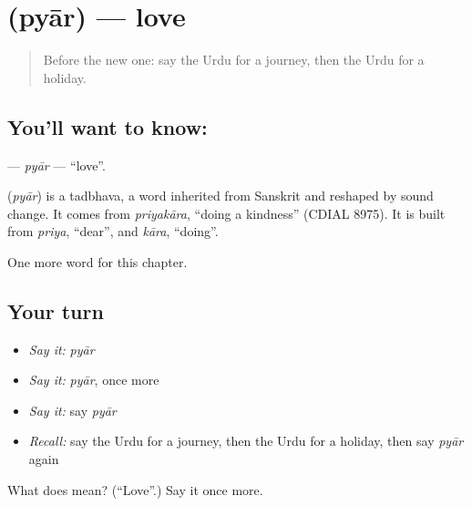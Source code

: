 \section[\texorpdfstring{\ur{پیار} (pyār)}{پیار (pyār)}]{ (pyār) — love}

\label{lesson:UR-C87-pyar}



\begin{quote}
Before the new one: say the Urdu for a journey, then the Urdu for a holiday.
\end{quote}

\subsection*{You'll want to know: }
\textbf{} — \emph{pyār} — \textquotedblleft{}love\textquotedblright{}.

\begin{cousinweb}
\textbf{} (\emph{pyār}) is a tadbhava, a word inherited from Sanskrit and reshaped by sound change. It comes from \emph{priyakāra}, \textquotedblleft{}doing a kindness\textquotedblright{} (CDIAL 8975). It is built from \emph{priya}, \textquotedblleft{}dear\textquotedblright{}, and \emph{kāra}, \textquotedblleft{}doing\textquotedblright{}.
\end{cousinweb}

\begin{grammarlens}[title={What you've built}]
One more word for this chapter.
\end{grammarlens}

\subsection*{Your turn}
\begin{itemize}
\raggedright
  \item \emph{Say it:} \emph{pyār}
  \item \emph{Say it:} \emph{pyār}, once more
  \item \emph{Say it:} say \emph{pyār}
  \item \emph{Recall:} say the Urdu for a journey, then the Urdu for a holiday, then say \emph{pyār} again
\end{itemize}

\begin{tcolorbox}[breakable,colback=teal!4,colframe=teal!35!black,title={Before you move on}]
What does  mean? (\textquotedblleft{}Love\textquotedblright{}.) Say it once more.
\end{tcolorbox}
